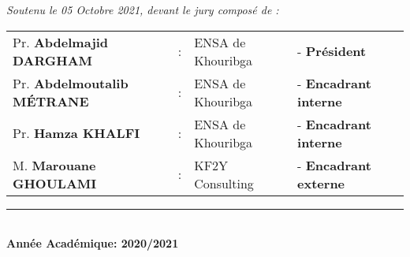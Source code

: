 \begin{titlepage}
\vfill
\centering
{\large \textit{Soutenu le 05 Octobre 2021, devant le jury composé de : }}\\[0.5cm]
\begin{tabular}{llll}
\large Pr. \textbf{Abdelmajid \textsc{DARGHAM}}     & : & \large ENSA de Khouribga & \large - \textbf{Président} \\[0.1cm]
\large Pr. \textbf{Abdelmoutalib \textsc{MÉTRANE}}         & : & \large ENSA de Khouribga & \large - \textbf{Encadrant interne} \\[0.1cm]
\large Pr. \textbf{Hamza \textsc{KHALFI}}         & : & \large ENSA de Khouribga & \large - \textbf{Encadrant interne} \\[0.1cm]
\large M. \textbf{Marouane \textsc{GHOULAMI}}    & : & \large KF2Y Consulting & \large - \textbf{Encadrant externe}
\end{tabular}

\vfill
\rule{0.95\textwidth}{2pt}\\
{\large \textbf{Année Académique: 2020/2021}}

\end{titlepage}
